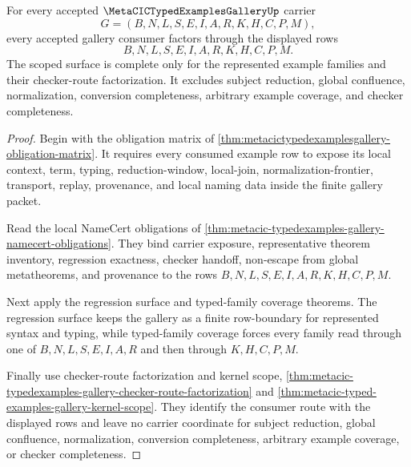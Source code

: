 \begin{theorem}
\label{thm:metacic-typedexamples-gallery-scope-completion}
For every accepted $\MetaCICTypedExamplesGalleryUp$ carrier
$$
G=(B,N,L,S,E,I,A,R,K,H,C,P,M),
$$
every accepted gallery consumer factors through the displayed rows
$$
B,N,L,S,E,I,A,R,K,H,C,P,M.
$$
The scoped surface is complete only for the represented example families and their checker-route factorization. It excludes subject reduction, global confluence, normalization, conversion completeness, arbitrary example coverage, and checker completeness.
\end{theorem}
\begin{proof}
Begin with the obligation matrix of \autoref{thm:metacictypedexamplesgallery-obligation-matrix}. It requires every consumed example row to expose its local context, term, typing, reduction-window, local-join, normalization-frontier, transport, replay, provenance, and local naming data inside the finite gallery packet.

Read the local NameCert obligations of \autoref{thm:metacic-typedexamples-gallery-namecert-obligations}. They bind carrier exposure, representative theorem inventory, regression exactness, checker handoff, non-escape from global metatheorems, and provenance to the rows $B,N,L,S,E,I,A,R,K,H,C,P,M$.

Next apply the regression surface and typed-family coverage theorems. The regression surface keeps the gallery as a finite row-boundary for represented syntax and typing, while typed-family coverage forces every family read through one of $B,N,L,S,E,I,A,R$ and then through $K,H,C,P,M$.

Finally use checker-route factorization and kernel scope, \autoref{thm:metacic-typedexamples-gallery-checker-route-factorization} and \autoref{thm:metacic-typed-examples-gallery-kernel-scope}. They identify the consumer route with the displayed rows and leave no carrier coordinate for subject reduction, global confluence, normalization, conversion completeness, arbitrary example coverage, or checker completeness.
\end{proof}

